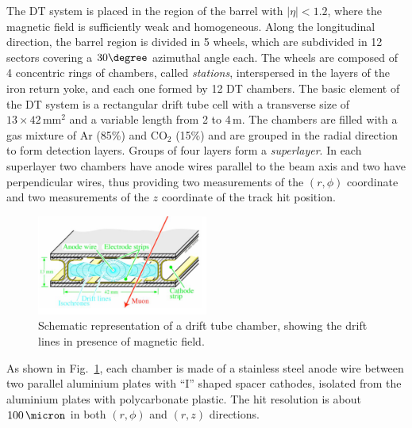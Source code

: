 The DT system is placed in the region of the barrel with $|\eta|<1.2$, where the magnetic field is sufficiently weak and homogeneous. Along the longitudinal direction, the barrel region is divided in 5 wheels, which are subdivided in 12 sectors covering a $30\degree$ azimuthal angle each. The wheels are composed of 4 concentric rings of chambers, called \emph{stations}, interspersed in the layers of the iron return yoke, and each one formed by 12 DT chambers. The basic element of the DT system is a rectangular drift tube cell with a transverse size of $13\times42\,\mathrm{mm^2}$ and a variable length from 2 to 4\,m. The chambers are filled with a gas mixture of Ar (85\%) and $\mathrm{CO_2}$ (15\%) and are grouped in the radial direction to form detection layers. Groups of four layers form a \emph{superlayer}. In each superlayer two chambers have anode wires parallel to the beam axis and two have perpendicular wires, thus providing two measurements of the $(r,\phi)$ coordinate and two measurements of the $z$ coordinate of the track hit position.
\begin{figure}[htb]
\centering
\includegraphics[width=0.5\textwidth]{images/drifttube.png}
\caption{Schematic representation of a drift tube chamber, showing the drift lines in presence of magnetic field.}\label{fig:dt}
\end{figure}
As shown in Fig.~\ref{fig:dt}, each chamber is made of a stainless steel anode wire between two parallel aluminium plates with ``I'' shaped spacer cathodes, isolated from the aluminium plates with polycarbonate plastic. The hit resolution is about $100\,\micron$ in both $(r,\phi)$ and $(r,z)$ directions.

